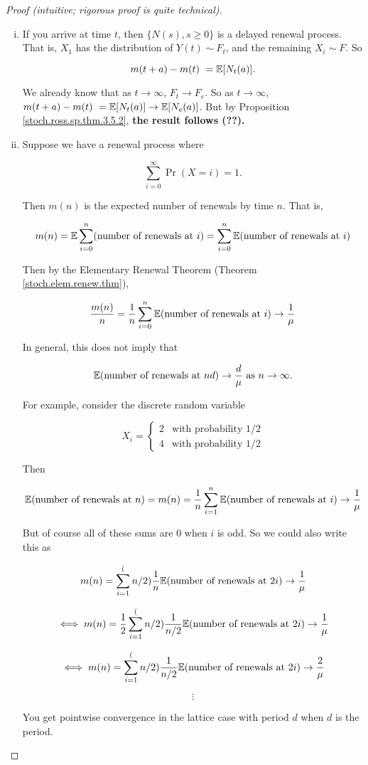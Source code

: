 \begin{proof}[Proof (intuitive; rigorous proof is quite technical)]

\begin{enumerate}[(i)]

\item If you arrive at time \(t\), then \(\{N(s), s \geq 0\}\) is a delayed renewal process. That is, \(X_1\) has the distribution of \(Y(t) \sim F_t\), and the remaining \(X_i \sim F\). So

\[
m(t+a) - m(t) \ = \mathbb{E}[N_t(a)].
\]

We already know that as \(t \to \infty\), \(F_t \to F_e\). So as \(t \to \infty\), \(m(t+a) - m(t) \ = \mathbb{E}[N_t(a)] \to \mathbb{E}[N_e(a)]\). But by Proposition \ref{stoch.ross.sp.thm.3.5.2}, \textbf{the result follows (??).}

\item Suppose we have a renewal process where

\[
\sum_{i=0}^\infty \Pr(X =i) = 1.
\]

Then \(m(n)\) is the expected number of renewals by time \(n\). That is,

\[
m(n) = \mathbb{E} \sum_{i=0}^n (\text{number of renewals at } i) = \sum_{i=0}^n \mathbb{E}  (\text{number of renewals at } i)
\]

Then by the Elementary Renewal Theorem (Theorem \ref{stoch.elem.renew.thm}),

\[
\frac{m(n)}{n} = \frac{1}{n}  \sum_{i=0}^n \mathbb{E}  (\text{number of renewals at } i) \to  \frac{1}{\mu}
\]

In general, this does not imply that 

\[
\mathbb{E}( \text{number of renewals at } nd) \to \frac{d}{\mu} \text{ as } n \to \infty.
\]

For example, consider the discrete random variable

\[
X_i = \begin{cases}
2 & \text{with probability } 1/2 \\
4 & \text{with probability } 1/2
\end{cases}
\]


Then

\[
\mathbb{E}( \text{number of renewals at } n) = m(n) = \frac{1}{n} \sum_{i=1}^n  \mathbb{E}  (\text{number of renewals at } i) \to \frac{1}{\mu}
\]

But of course all of these sums are 0 when \(i\) is odd. So we could also write this as 

\[
m(n) =\sum_{i=1}^(n/2)   \frac{1}{n} \mathbb{E}  (\text{number of renewals at } 2i) \to \frac{1}{\mu}
\]

\[
\iff m(n) = \frac{1}{2} \sum_{i=1}^(n/2)   \frac{1}{n/2}\mathbb{E}  (\text{number of renewals at } 2i) \to \frac{1}{\mu}
\]

\[
\iff m(n) =\sum_{i=1}^(n/2)   \frac{1}{n/2}\mathbb{E}  (\text{number of renewals at } 2i) \to \frac{2}{\mu}
\]

\[
\vdots
\]

You get pointwise convergence in the lattice case with period \(d\) when \(d\) is the period.

\end{enumerate}

\end{proof}

